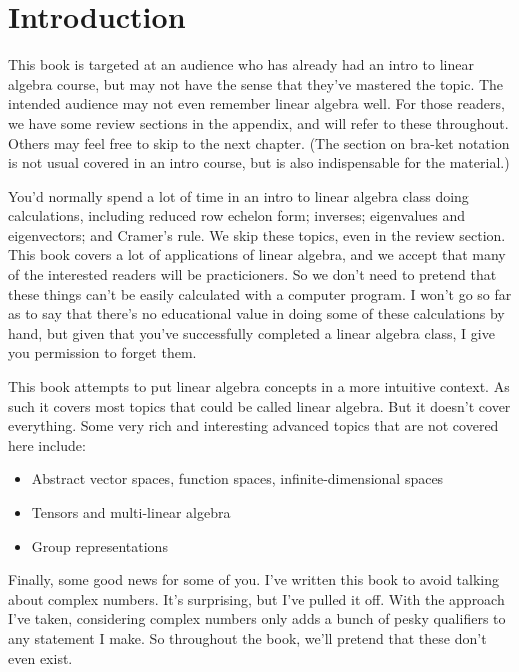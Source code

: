 \documentclass{amsbook}
\begin{document}
\setcounter{chapter}{-1}
\chapter{Introduction}

This book is targeted at an audience who has already had an intro to linear algebra course, but may not have the sense that they've mastered the topic.  The intended audience may not even remember linear algebra well.  For those readers, we have some review sections in the appendix, and will refer to these throughout.  Others may feel free to skip to the next chapter.  (The section on bra-ket notation is not usual covered in an intro course, but is also indispensable for the material.)

You'd normally spend a lot of time in an intro to linear algebra class doing calculations, including reduced row echelon form; inverses; eigenvalues and eigenvectors; and Cramer's rule.  We skip these topics, even in the review section.  This book covers a lot of applications of linear algebra, and we accept that many of the interested readers will be practicioners.  So we don't need to pretend that these things can't be easily calculated with a computer program.  I won't go so far as to say that there's no educational value in doing some of these calculations by hand, but given that you've successfully completed a linear algebra class, I give you permission to forget them.

This book attempts to put linear algebra concepts in a more intuitive context.  As such it covers most topics that could be called linear algebra.  But it doesn't cover everything.  Some very rich and interesting advanced topics that are not covered here include:

\begin{itemize}
\item Abstract vector spaces, function spaces, infinite-dimensional spaces
\item Tensors and multi-linear algebra
\item Group representations
\end{itemize}

Finally, some good news for some of you.  I've written this book to avoid talking about complex numbers.  It's surprising, but I've pulled it off.  With the approach I've taken, considering complex numbers only adds a bunch of pesky qualifiers to any statement I make.  So throughout the book, we'll pretend that these don't even exist.
\end{document}
